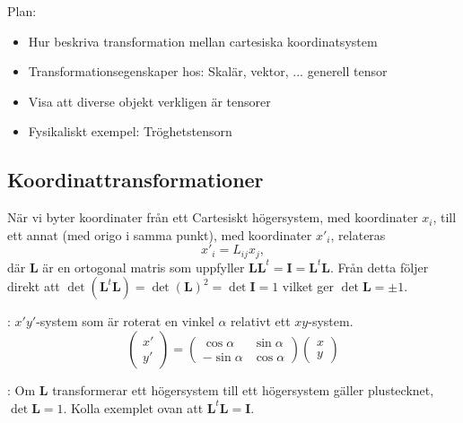 \documentclass[%
oneside,                 %
final,                   %
10pt]{article}
\newcommand{\shortinlinecomment}[3]{{\color{red}{\bf #1}: #2}}
\newcommand{\longinlinecomment}[3]{{\color{red}{\bf #1}: #2}}
\begin{document}
\noindent
Plan:
\begin{itemize}
\item Hur beskriva transformation mellan cartesiska koordinatsystem

\item Transformationsegenskaper hos: Skalär, vektor, ... generell tensor

\item Visa att diverse objekt verkligen är tensorer

\item Fysikaliskt exempel: Tröghetstensorn
\end{itemize}

\noindent
\subsection{Koordinattransformationer}

När vi byter koordinater från ett Cartesiskt högersystem, med koordinater
$x_i$, till ett annat (med origo i samma punkt), med koordinater $x'_i$, relateras 
\begin{equation}
x'_i=L_{ij}x_j,
\label{eq:transformation}
\end{equation}
där $\mathbf{L}$ är en ortogonal matris som uppfyller $\mathbf{L}\mathbf{L}^t = \mathbf{I}=\mathbf{L}^t\mathbf{L}$. Från detta följer direkt att $\det(\mathbf{L}^t\mathbf{L}) =  \det(\mathbf{L})^2 = \det\mathbf{I}=1$ vilket ger $\det\mathbf{L}=\pm 1$. 

\shortinlinecomment{Rita 1}{ $x'y'$-system som är roterat en vinkel $\alpha$ relativt ett $xy$-system. }{ $x'y'$-system som är roterat }
\begin{equation}
\begin{pmatrix}
x' \\ y'
\end{pmatrix}
= 
\begin{pmatrix}
\cos\alpha & \sin\alpha \\
-\sin\alpha & \cos\alpha
\end{pmatrix}
\begin{pmatrix}
x \\ y
\end{pmatrix}
\end{equation}

\longinlinecomment{Comment 2}{ Om $\mathbf{L}$ transformerar ett högersystem till ett högersystem gäller plustecknet, $\det\mathbf{L}=1$. Kolla exemplet ovan att $\mathbf{L}^t \mathbf{L} = \mathbf{I}$. }{ Om $\mathbf{L}$ transformerar ett }
\end{document}
